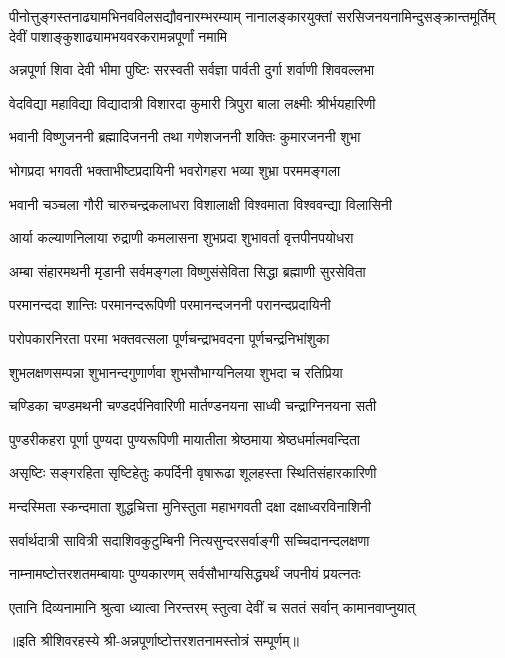 
{पीनोत्तुङ्गस्तनाढ्यामभिनवविलसद्यौवनारम्भरम्याम्}
{नानालङ्कारयुक्तां सरसिजनयनामिन्दुसङ्क्रान्तमूर्तिम्}
{देवीं पाशाङ्कुशाढ्यामभयवरकरामन्नपूर्णां नमामि}


\twolineshloka
{अन्नपूर्णा शिवा देवी भीमा पुष्टिः सरस्वती}
{सर्वज्ञा पार्वती दुर्गा शर्वाणी शिववल्लभा}

\twolineshloka
{वेदविद्या महाविद्या विद्यादात्री विशारदा}
{कुमारी त्रिपुरा बाला लक्ष्मीः श्रीर्भयहारिणी}

\twolineshloka
{भवानी विष्णुजननी ब्रह्मादिजननी तथा}
{गणेशजननी शक्तिः कुमारजननी शुभा}

\twolineshloka
{भोगप्रदा भगवती भक्ताभीष्टप्रदायिनी}
{भवरोगहरा भव्या शुभ्रा परममङ्गला}

\twolineshloka
{भवानी चञ्चला गौरी चारुचन्द्रकलाधरा}
{विशालाक्षी विश्वमाता विश्ववन्द्या विलासिनी}

\twolineshloka
{आर्या कल्याणनिलाया रुद्राणी कमलासना}
{शुभप्रदा शुभावर्ता वृत्तपीनपयोधरा}

\twolineshloka
{अम्बा संहारमथनी मृडानी सर्वमङ्गला}
{विष्णुसंसेविता सिद्धा ब्रह्माणी सुरसेविता}

\twolineshloka
{परमानन्ददा शान्तिः परमानन्दरूपिणी}
{परमानन्दजननी परानन्दप्रदायिनी}

\twolineshloka
{परोपकारनिरता परमा भक्तवत्सला}
{पूर्णचन्द्राभवदना पूर्णचन्द्रनिभांशुका}

\twolineshloka
{शुभलक्षणसम्पन्ना शुभानन्दगुणार्णवा}
{शुभसौभाग्यनिलया शुभदा च रतिप्रिया}

\twolineshloka
{चण्डिका चण्डमथनी चण्डदर्पनिवारिणी}
{मार्तण्डनयना साध्वी चन्द्राग्निनयना सती}

\twolineshloka
{पुण्डरीकहरा पूर्णा पुण्यदा पुण्यरूपिणी}
{मायातीता श्रेष्ठमाया श्रेष्ठधर्मात्मवन्दिता}

\twolineshloka
{असृष्टिः सङ्गरहिता सृष्टिहेतुः कपर्दिनी}
{वृषारूढा शूलहस्ता स्थितिसंहारकारिणी}

\twolineshloka
{मन्दस्मिता स्कन्दमाता शुद्धचित्ता मुनिस्तुता}
{महाभगवती दक्षा दक्षाध्वरविनाशिनी}

\twolineshloka
{सर्वार्थदात्री सावित्री सदाशिवकुटुम्बिनी}
{नित्यसुन्दरसर्वाङ्गी सच्चिदानन्दलक्षणा}

\twolineshloka
{नाम्नामष्टोत्तरशतमम्बायाः पुण्यकारणम्}
{सर्वसौभाग्यसिद्ध्यर्थं जपनीयं प्रयत्नतः}

\twolineshloka
{एतानि दिव्यनामानि श्रुत्वा ध्यात्वा निरन्तरम्}
{स्तुत्वा देवीं च सततं सर्वान् कामानवाप्नुयात्}

{॥इति श्रीशिवरहस्ये श्री-अन्नपूर्णाष्टोत्तरशतनामस्तोत्रं सम्पूर्णम्॥}
